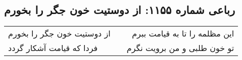 \begin{center}
\section*{رباعی شماره ۱۱۵۵: از دوستیت خون جگر را بخورم}
\label{sec:1155}
\begin{longtable}{l p{0.5cm} r}
از دوستیت خون جگر را بخورم
&&
این مظلمه را تا به قیامت ببرم
\\
فردا که قیامت آشکار گردد
&&
تو خون طلبی و من برویت نگرم
\\
\end{longtable}
\end{center}

